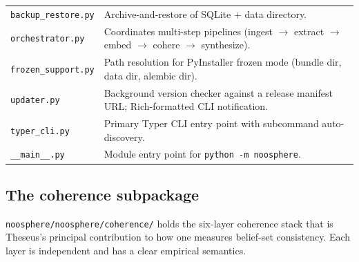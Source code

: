 \documentclass[11pt,letterpaper]{article}
\newcommand{\mod}[1]{\texttt{#1}}
\newcommand{\file}[1]{\texttt{#1}}
\begin{document}
\begin{longtable}{p{3.5cm} p{11cm}}
\mod{backup\_restore.py}    & Archive-and-restore of SQLite + data directory. \\
\mod{orchestrator.py}       & Coordinates multi-step pipelines (ingest $\to$ extract $\to$ embed $\to$ cohere $\to$ synthesize). \\
\mod{frozen\_support.py}    & Path resolution for PyInstaller frozen mode (bundle dir, data dir, alembic dir). \\
\mod{updater.py}            & Background version checker against a release manifest URL; Rich-formatted CLI notification. \\
\mod{typer\_cli.py}         & Primary Typer CLI entry point with subcommand auto-discovery. \\
\mod{\_\_main\_\_.py}       & Module entry point for \file{python -m noosphere}. \\
\bottomrule
\end{longtable}

\subsection{The coherence subpackage}

\file{noosphere/noosphere/coherence/} holds the six-layer coherence stack that is Theseus's principal contribution to how one measures belief-set consistency. Each layer is independent and has a clear empirical semantics.
\end{document}

